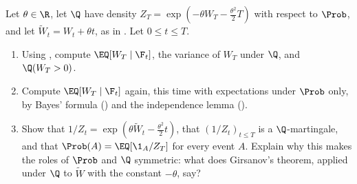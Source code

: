 
\begin{exercise}\label{ex:rn-two-ways}
\easy Let $\theta\in\R$, let $\Q$ have density $Z_T=\exp(-\theta W_T-\frac{\theta^2}2T)$ with
respect to $\Prob$, and let $\widetilde W_t=W_t+\theta t$, as in .
Let $0\le t\le T$.
\begin{enumerate}[label=(\alph*)]
  \item Using , compute $\EQ[W_T\mid\F_t]$, the variance of $W_T$
    under $\Q$, and $\Q(W_T>0)$.
  \item Compute $\EQ[W_T\mid\F_t]$ again, this time with expectations under $\Prob$ only,
    by Bayes' formula () and the independence lemma
    ().
  \item Show that $1/Z_t=\exp(\theta\widetilde W_t-\frac{\theta^2}2t)$, that $(1/Z_t)_{t\le T}$
    is a $\Q$-martingale, and that $\Prob(A)=\EQ[\1_A/Z_T]$ for every event $A$. Explain why
    this makes the roles of $\Prob$ and $\Q$ symmetric: what does Girsanov's theorem, applied
    under $\Q$ to $\widetilde W$ with the constant $-\theta$, say?
\end{enumerate}
\end{exercise}

